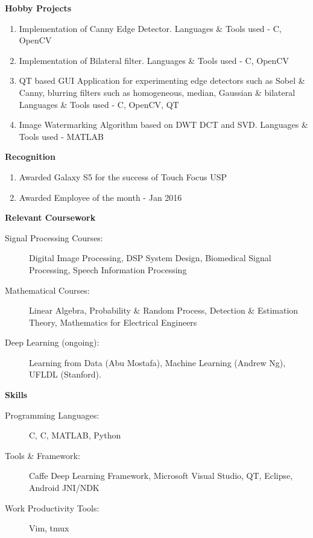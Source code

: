 \documentclass[letterpaper,11pt]{article}
\def\CC{{C\nolinebreak[4]\hspace{-.05em}\raisebox{.4ex}{\tiny\bf ++}}}
\newcommand{\resheading}[1]{{\large \colorbox{mygrey}{\begin{minipage}{\textwidth}{\textbf{#1 \vphantom{p\^{E}}}}\end{minipage}}}}
\begin{document}
\resheading{Hobby Projects}
\begin{enumerate}
	\item Implementation of Canny Edge Detector. Languages \& Tools used - \CC, OpenCV
	\item Implementation of Bilateral filter. Languages \& Tools used - \CC, OpenCV
	\item QT based GUI Application for experimenting edge detectors such as Sobel \& Canny, blurring filters such as homogeneous, median, Gaussian \& bilateral
		Languages \& Tools used - \CC, OpenCV, QT
	\item Image Watermarking Algorithm based on DWT DCT and SVD.  Languages \& Tools used - MATLAB
\end{enumerate}

\resheading{Recognition}
\begin{enumerate}
	\item Awarded Galaxy S5 for the success of Touch Focus USP
	\item Awarded Employee of the month - Jan 2016
\end{enumerate}

\resheading{Relevant Coursework}
\begin{description}
	\item[Signal Processing Courses:]
		Digital Image Processing, DSP System Design, Biomedical Signal Processing, Speech Information Processing
	\item[Mathematical Courses:]
		Linear Algebra, Probability \& Random Process, Detection \& Estimation Theory, Mathematics for Electrical Engineers
	\item[Deep Learning (ongoing):]
		Learning from Data (Abu Mostafa), Machine Learning (Andrew Ng), UFLDL (Stanford).
\end{description}

\resheading{Skills}
\begin{description}
	\item[Programming Languages:]
		C, \CC, MATLAB, Python
	\item[Tools \& Framework:]
		Caffe Deep Learning Framework, Microsoft Visual Studio, QT, Eclipse, Android JNI/NDK
	\item[Work Productivity Tools:] Vim, tmux
\end{description}
\end{document}
